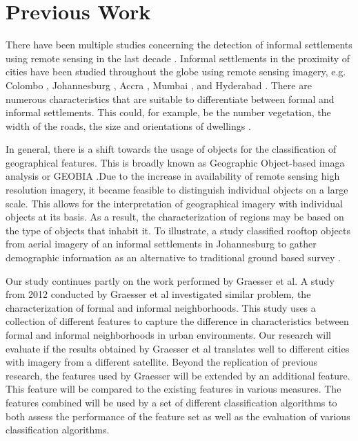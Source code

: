 \section{Previous Work}

There have been multiple studies concerning the detection of informal
settlements using remote sensing in the last decade \cite{kuffer2016slums}.
Informal settlements in the proximity of cities have been studied throughout
the globe using remote sensing imagery, e.g. Colombo \cite{colombo},
Johannesburg \cite{williams2016automatic}, Accra \cite{accra}, Mumbai
\cite{mumbai}, and Hyderabad \cite{hyderabad}. There are numerous
characteristics that are suitable to differentiate between formal and informal
settlements. This could, for example,  be the number vegetation, the width of
the roads, the size and orientations of dwellings \cite{owen2013approach}.

In general, there is a shift towards the usage of objects for the
classification of geographical features. This is broadly known as Geographic
Object-based imaga analysis or GEOBIA \cite{hay2008geographic}.Due to the
increase in availability of remote sensing high resolution imagery, it became
feasible to distinguish individual objects on a large scale.  This allows for
the interpretation of geographical imagery with individual objects at its
basis.  As a result, the characterization of regions may be based on the type
of objects that inhabit it.  To illustrate, a study classified rooftop objects
from aerial imagery of an informal settlements in Johannesburg to gather
demographic information as an alternative to traditional ground based survey
\cite{williams2016automatic}.


Our study continues partly on the work performed by Graesser et al.  A study
from 2012 conducted by Graesser et al  investigated similar
problem, the characterization of formal and informal neighborhoods.  This study
uses a collection of different features to capture the difference in
characteristics between formal and informal neighborhoods in urban
environments. Our research will evaluate if the results obtained by Graesser et
al translates well to different cities with imagery from a different
satellite. Beyond the replication of previous research, the features used by
Graesser will be extended by an additional feature. This feature will be
compared to the existing features in various measures. The features combined
will be used by a set of different classification algorithms to both assess the
performance of the feature set as well as the evaluation of various
classification algorithms.


